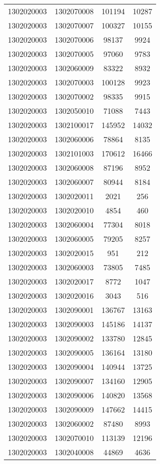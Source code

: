 \begin{longtable}{llcc}
1302020003 & 1302070008 & 101194 & 10287\\
1302020003 & 1302070007 & 100327 & 10155\\
1302020003 & 1302070006 & 98137 & 9924\\
1302020003 & 1302070005 & 97060 & 9783\\
1302020003 & 1302060009 & 83322 & 8932\\
1302020003 & 1302070003 & 100128 & 9923\\
1302020003 & 1302070002 & 98335 & 9915\\
1302020003 & 1302050010 & 71088 & 7443\\
1302020003 & 1302100017 & 145952 & 14032\\
1302020003 & 1302060006 & 78864 & 8135\\
1302020003 & 1302101003 & 170612 & 16466\\
1302020003 & 1302060008 & 87196 & 8952\\
1302020003 & 1302060007 & 80944 & 8184\\
1302020003 & 1302020011 & 2021 & 256\\
1302020003 & 1302020010 & 4854 & 460\\
1302020003 & 1302060004 & 77304 & 8018\\
1302020003 & 1302060005 & 79205 & 8257\\
1302020003 & 1302020015 & 951 & 212\\
1302020003 & 1302060003 & 73805 & 7485\\
1302020003 & 1302020017 & 8772 & 1047\\
1302020003 & 1302020016 & 3043 & 516\\
1302020003 & 1302090001 & 136767 & 13163\\
1302020003 & 1302090003 & 145186 & 14137\\
1302020003 & 1302090002 & 133780 & 12845\\
1302020003 & 1302090005 & 136164 & 13180\\
1302020003 & 1302090004 & 140944 & 13725\\
1302020003 & 1302090007 & 134160 & 12905\\
1302020003 & 1302090006 & 140820 & 13568\\
1302020003 & 1302090009 & 147662 & 14415\\
1302020003 & 1302060002 & 87480 & 8993\\
1302020003 & 1302070010 & 113139 & 12196\\
1302020003 & 1302040008 & 44869 & 4636\\

\end{longtable}
